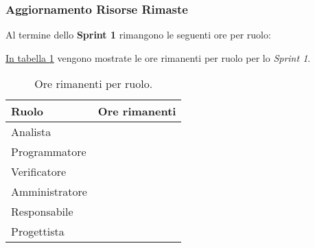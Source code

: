 \subsubsection{Aggiornamento Risorse Rimaste}
Al termine dello \textbf{Sprint 1} rimangono le seguenti ore per ruolo:

\hyperref[tab:sprint1_ore_rimanenti]{In tabella \ref{tab:sprint1_ore_rimanenti}} vengono mostrate le ore rimanenti per ruolo per lo \textit{Sprint 1}.

\begin{table}[!h]
    \centering
    \begin{tabular}{| l | l |}
    \hline
        Ruolo & Ore rimanenti\\
    \hline
        Analista & \\
    \hline
        Programmatore & \\
    \hline
        Verificatore & \\
    \hline
        Amministratore & \\
    \hline
        Responsabile & \\
    \hline
        Progettista & \\
    \hline
    \end{tabular}
    \caption{Ore rimanenti per ruolo.}
    \label{tab:sprint1_ore_rimanenti} 
\end{table}